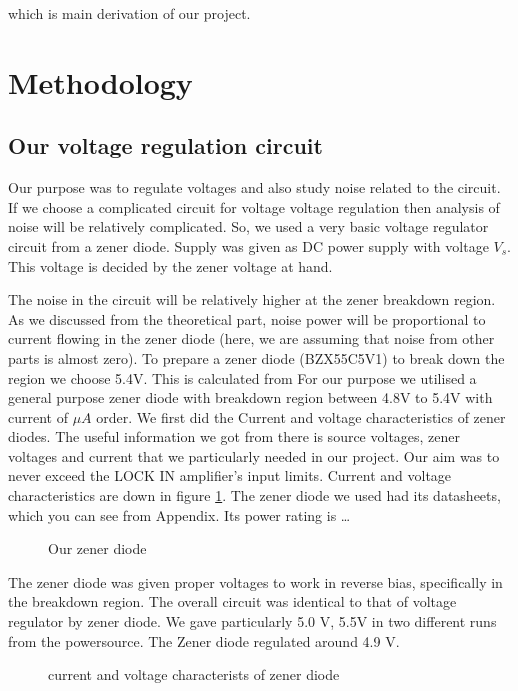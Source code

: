 \documentclass[draft,12pt]{article}
\begin{document}
which is main derivation of our project.


\clearpage
\section{Methodology}\label{methodology}


\subsection{Our voltage regulation circuit}

Our purpose was to regulate voltages and also study noise related to the circuit. If we choose a complicated circuit for voltage voltage regulation then analysis of noise will be relatively complicated. So, we used a very basic voltage regulator circuit from a zener diode. Supply was given as DC power supply with voltage $V_{s}$. This voltage is decided by the zener voltage at hand.

The noise in the circuit will be relatively higher at the zener breakdown region. As we discussed from the theoretical part, noise power will be proportional to current flowing in the zener diode (here, we are assuming that noise from other parts is almost zero). To prepare a zener diode (BZX55C5V1) to break down the region we choose 5.4V. This is calculated from 
For our purpose we utilised a general purpose zener diode with breakdown region between 4.8V to 5.4V with current of $\mu A$ order. We first did the Current and voltage characteristics of zener diodes. The useful information we got from there is source voltages, zener voltages and current that we particularly needed in our project. Our aim was to never exceed the LOCK IN amplifier’s input limits. Current and voltage characteristics are down in figure \ref{exiv}. The zener diode we used had its datasheets, which you can see from Appendix. Its power rating is … 

\begin{figure}[hbt!]
\caption{Our zener diode}
\end{figure}

The zener diode was given proper voltages to work in reverse bias, specifically in the breakdown region. The overall circuit was identical to that of voltage regulator by zener diode. We gave particularly 5.0 V, 5.5V in two different runs from the powersource. The Zener diode regulated around 4.9 V. 

\begin{figure}[hbt!]
\caption{current and voltage characterists of zener diode \label{exiv}}
\end{figure}
\end{document}
